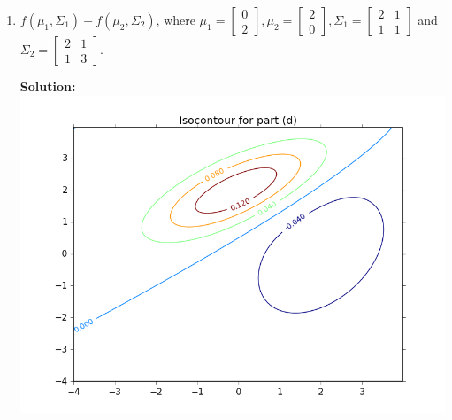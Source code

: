 \documentclass{article}
\newcommand{\solution}{\textbf{Solution: }}
\begin{document}
\begin{enumerate}[label=(\alph*)]
    \newpage
    \item $f(\mu_1, \Sigma_1) - f(\mu_2, \Sigma_2)$, where $\mu_1 = \begin{bmatrix} 0 \\ 2 \end{bmatrix}, \mu_2 = \begin{bmatrix} 2 \\ 0 \end{bmatrix}, \Sigma_1 = \begin{bmatrix} 2 & 1 \\ 1 & 1 \end{bmatrix}$ and $\Sigma_2 = \begin{bmatrix} 2 & 1 \\ 1 & 3 \end{bmatrix}$.
    \begin{mdframed} \solution\\
    \includegraphics[scale=.75]{images/isocontour_d.png}
    \end{mdframed}
    

\end{enumerate}
\end{document}
